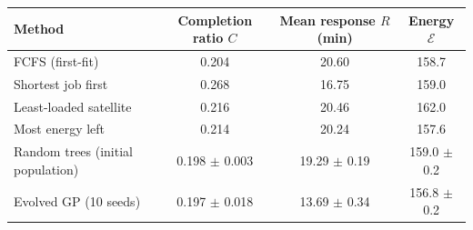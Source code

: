\begin{tabular}{lccc}\toprule
Method & Completion ratio $C$ & Mean response $R$ (min) & Energy $\mathcal{E}$\\\midrule
FCFS (first-fit) & 0.204 & 20.60 & 158.7\\
Shortest job first & 0.268 & 16.75 & 159.0\\
Least-loaded satellite & 0.216 & 20.46 & 162.0\\
Most energy left & 0.214 & 20.24 & 157.6\\
Random trees (initial population) & 0.198 $\pm$ 0.003 & 19.29 $\pm$ 0.19 & 159.0 $\pm$ 0.2\\
\midrule
Evolved GP (10 seeds) & 0.197 $\pm$ 0.018 & 13.69 $\pm$ 0.34 & 156.8 $\pm$ 0.2\\\bottomrule
\end{tabular}